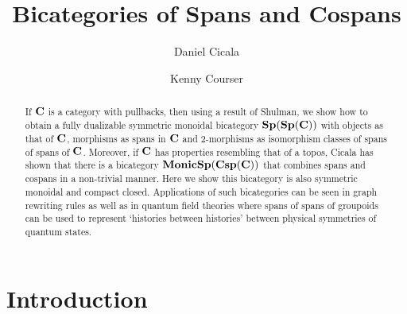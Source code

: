 \documentclass[11pt]{amsart}
\theoremstyle{remark}
\theoremstyle{definition}
\begin{document}
	

\begin{abstract}
	If $\bold{C}$ is a category with pullbacks, then using a result of Shulman, we show how to obtain a fully dualizable symmetric monoidal bicategory $\bold{Sp(Sp(C))}$ with objects as that of $\bold{C}$, morphisms as spans in $\bold{C}$ and 2-morphisms as isomorphism classes of spans of spans of $\bold{C}$. Moreover, if $\bold{C}$ has properties resembling that of a topos, Cicala has shown that there is a bicategory $\bold{MonicSp(Csp(C))}$ that combines spans and cospans in a non-trivial manner. Here we show this bicategory is also symmetric monoidal and compact closed. Applications of such bicategories can be seen in graph rewriting rules as well as in quantum field theories where spans of spans of groupoids can be used to represent `histories between histories' between physical symmetries of quantum states.
\end{abstract}

\title{Bicategories of Spans and Cospans}
\author{Daniel Cicala \and Kenny Courser}
\maketitle

\section{Introduction} %
\label{sec:Introduction}
\end{document}
